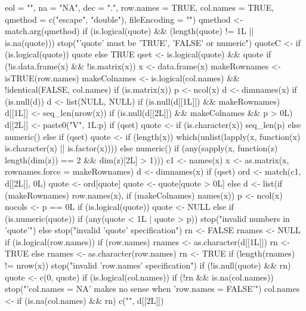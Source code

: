 \documentclass{article}
\begin{document}
\begin{Schunk}
\begin{Soutput}
    eol = "\n", na = "NA", dec = ".", row.names = TRUE, col.names = TRUE, 
    qmethod = c("escape", "double"), fileEncoding = "") 
{
    qmethod <- match.arg(qmethod)
    if (is.logical(quote) && (length(quote) != 1L || is.na(quote))) 
        stop("'quote' must be 'TRUE', 'FALSE' or numeric")
    quoteC <- if (is.logical(quote)) 
        quote
    else TRUE
    qset <- is.logical(quote) && quote
    if (!is.data.frame(x) && !is.matrix(x)) 
        x <- data.frame(x)
    makeRownames <- isTRUE(row.names)
    makeColnames <- is.logical(col.names) && !identical(FALSE, 
        col.names)
    if (is.matrix(x)) {
        p <- ncol(x)
        d <- dimnames(x)
        if (is.null(d)) 
            d <- list(NULL, NULL)
        if (is.null(d[[1L]]) && makeRownames) 
            d[[1L]] <- seq_len(nrow(x))
        if (is.null(d[[2L]]) && makeColnames && p > 0L) 
            d[[2L]] <- paste0("V", 1L:p)
        if (qset) 
            quote <- if (is.character(x)) 
                seq_len(p)
            else numeric()
    }
    else {
        if (qset) 
            quote <- if (length(x)) 
                which(unlist(lapply(x, function(x) is.character(x) || 
                  is.factor(x))))
            else numeric()
        if (any(sapply(x, function(z) length(dim(z)) == 2 && 
            dim(z)[2L] > 1))) {
            c1 <- names(x)
            x <- as.matrix(x, rownames.force = makeRownames)
            d <- dimnames(x)
            if (qset) {
                ord <- match(c1, d[[2L]], 0L)
                quote <- ord[quote]
                quote <- quote[quote > 0L]
            }
        }
        else d <- list(if (makeRownames) row.names(x), if (makeColnames) names(x))
        p <- ncol(x)
    }
    nocols <- p == 0L
    if (is.logical(quote)) 
        quote <- NULL
    else if (is.numeric(quote)) {
        if (any(quote < 1L | quote > p)) 
            stop("invalid numbers in 'quote'")
    }
    else stop("invalid 'quote' specification")
    rn <- FALSE
    rnames <- NULL
    if (is.logical(row.names)) {
        if (row.names) {
            rnames <- as.character(d[[1L]])
            rn <- TRUE
        }
    }
    else {
        rnames <- as.character(row.names)
        rn <- TRUE
        if (length(rnames) != nrow(x)) 
            stop("invalid 'row.names' specification")
    }
    if (!is.null(quote) && rn) 
        quote <- c(0, quote)
    if (is.logical(col.names)) {
        if (!rn && is.na(col.names)) 
            stop("'col.names = NA' makes no sense when 'row.names = FALSE'")
        col.names <- if (is.na(col.names) && rn) 
            c("", d[[2L]])
}}
\end{Soutput}
\end{Schunk}
\end{document}
